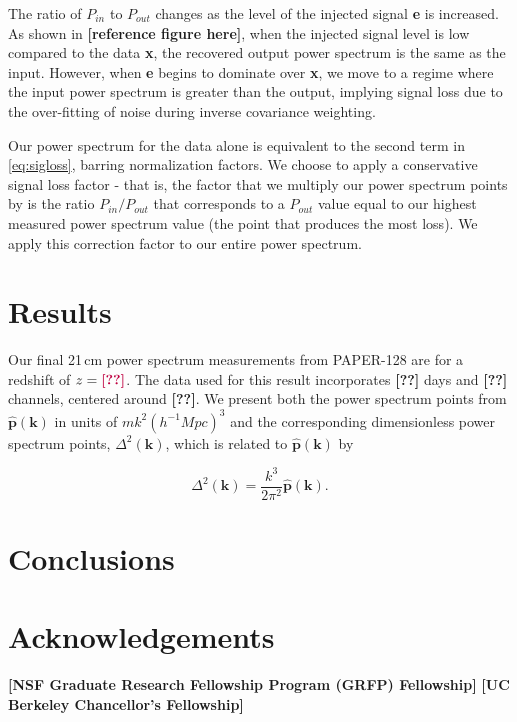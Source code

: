 \documentclass[preprint2,numberedappendix,tighten,twocolappendix]{aastex6}  %
\newcommand{\cc}[1]{{\color{purple} \textbf{[#1]}}}
\begin{document}
The ratio of $P_{in}$ to $P_{out}$ changes as the level of the injected signal \textbf{e} is increased. As shown in \cc{reference figure here}, when the injected signal level is low compared to the data \textbf{x}, the recovered output power spectrum is the same as the input. However, when \textbf{e} begins to dominate over  \textbf{x}, we move to a regime where the input power spectrum is greater than the output, implying signal loss due to the over-fitting of noise during inverse covariance weighting. 

Our power spectrum for the data alone is equivalent to the second term in \eqref{eq:sigloss}, barring normalization factors. We choose to apply a conservative signal loss factor - that is, the factor that we multiply our power spectrum points by is the ratio $P_{in}/P_{out}$ that corresponds to a $P_{out}$ value equal to our highest measured power spectrum value (the point that produces the most loss). We apply this correction factor to our entire power spectrum.

\section{Results}
\label{sec:Res}

Our final 21\,cm power spectrum measurements from PAPER-128 are for a redshift of $z=\cc{??}$. The data used for this result incorporates \cc{??} days and \cc{??} channels, centered around \cc{??}. We present both the power spectrum points from $\hat{\textbf{p}}(\textbf{k})$ in units of $mk^{2}(h^{-1}Mpc)^{3}$ and the corresponding dimensionless power spectrum points, $\Delta^{2}(\textbf{k})$, which is related to $\hat{\textbf{p}}(\textbf{k})$ by

\begin{equation}
\label{eq:deltasq}
\Delta^{2}(\textbf{k}) = \frac{k^{3}}{2\pi^{2}}\hat{\textbf{p}}(\textbf{k}).
\end{equation}

\section{Conclusions}
\label{sec:Con}

\section{Acknowledgements}
\cc{NSF Graduate Research Fellowship Program (GRFP) Fellowship}
\cc{UC Berkeley Chancellor's Fellowship}
\label{sec:Ack}



\end{document}

